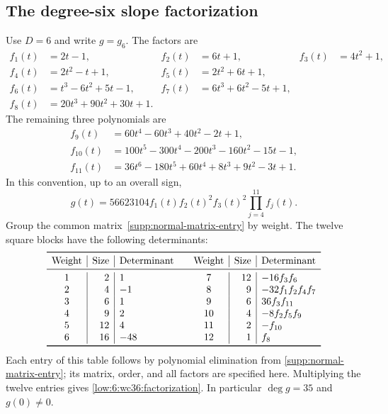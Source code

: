 \documentclass[11pt]{amsart}
\theoremstyle{definition}
\theoremstyle{remark}
\numberwithin{equation}{section}
\begin{document}
\subsection{The degree-six slope factorization}\label{supp:g6-factors}
Use $D=6$ and write $g=g_6$. The factors are
\[
\begin{aligned}
f_1(t)&=2t-1,& f_2(t)&=6t+1,& f_3(t)&=4t^2+1,\\
f_4(t)&=2t^2-t+1,& f_5(t)&=2t^2+6t+1,\\
f_6(t)&=t^3-6t^2+5t-1,& f_7(t)&=6t^3+6t^2-5t+1,\\
f_8(t)&=20t^3+90t^2+30t+1.
\end{aligned}
\]
The remaining three polynomials are
\[
\begin{aligned}
f_9(t)&=60t^4-60t^3+40t^2-2t+1,\\
f_{10}(t)&=100t^5-300t^4-200t^3-160t^2-15t-1,\\
f_{11}(t)&=36t^6-180t^5+60t^4+8t^3+9t^2-3t+1.
\end{aligned}
\]
In this convention, up to an overall sign,
\begin{equation}\label{low:6:wc36:factorization}
g(t)=56623104 f_1(t)f_2(t)^2f_3(t)^2\prod_{j=4}^{11}f_j(t).
\end{equation}
Group the common matrix~\eqref{supp:normal-matrix-entry} by weight. The twelve square blocks have the following determinants:
\[
\begin{array}{c|r|l@{\qquad}c|r|l}
\toprule
\text{Weight}&\text{Size}&\text{Determinant}&\text{Weight}&\text{Size}&\text{Determinant}\\
\midrule
1&2&1&7&12&-16f_3f_6\\
2&4&-1&8&9&-32f_1f_2f_4f_7\\
3&6&1&9&6&36f_3f_{11}\\
4&9&2&10&4&-8f_2f_5f_9\\
5&12&4&11&2&-f_{10}\\
6&16&-48&12&1&f_8\\
\bottomrule
\end{array}
\]
Each entry of this table follows by polynomial elimination from \eqref{supp:normal-matrix-entry}; its matrix, order, and all factors are specified here. Multiplying the twelve entries gives \eqref{low:6:wc36:factorization}. In particular $\deg g=35$ and $g(0)\ne0$.
\end{document}
